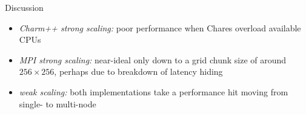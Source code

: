 \vspace{-0.5ex}
\begin{block}{Discussion}
{\small
\vspace{-1ex}
\begin{itemize}
\item \textit{Charm++ strong scaling:} poor performance when Chares overload available CPUs
\item \textit{MPI strong scaling:} near-ideal only down to a grid chunk size of around $256\times256$, perhaps due to breakdown of latency hiding
\item \textit{weak scaling:} both implementations take a performance hit moving from single- to multi-node
\end{itemize}
}
\end{block}
